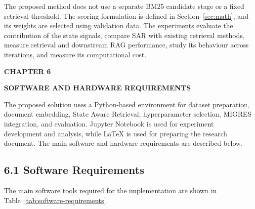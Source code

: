 \documentclass[12pt,a4paper]{report}
\newcommand{\chaptertitle}[2]{
    \begin{center}
        {\fontsize{18}{21}\selectfont\bfseries CHAPTER #1\par}
        \vspace{0.10in}
        {\fontsize{18}{21}\selectfont\bfseries #2\par}
    \end{center}
    \vspace{0.12in}
}
\begin{document}
The proposed method does not use a separate BM25 candidate stage or a
fixed retrieval threshold. The scoring formulation is defined in
Section~\ref{sec:math}, and its weights are selected using validation
data. The experiments evaluate the
contribution of the state signals, compare SAR with existing retrieval
methods, measure retrieval and downstream RAG performance, study its
behaviour across iterations, and measure its computational cost.
\label{ch:5:end}

\clearpage


\setcounter{table}{0}
\renewcommand{\thetable}{6.\arabic{table}}


\chaptertitle{6}{SOFTWARE AND HARDWARE REQUIREMENTS}
\label{ch:6}

\justifying

The proposed solution uses a Python-based environment for dataset
preparation, document embedding, State Aware Retrieval, hyperparameter
selection, MIGRES integration, and evaluation. Jupyter Notebook is used
for experiment development and analysis, while LaTeX is used for
preparing the research document. The main software and hardware
requirements are described below.

\subsection*{6.1 Software Requirements}

The main software tools required for the implementation are shown in
Table~\ref{tab:software-requirements}.
\end{document}
